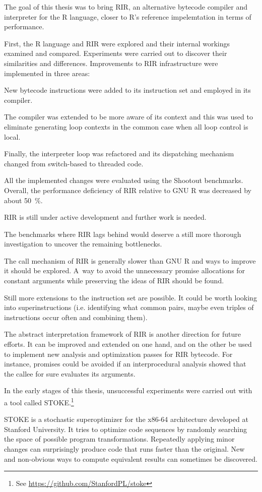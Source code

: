 The goal of this thesis was to bring RIR, an alternative bytecode compiler and interpreter for the R language, closer to R's reference impelemtation in terms of performance.

First, the R language and RIR were explored and their internal workings examined and compared. Experiments were carried out to discover their similarities and differences. Improvements to RIR infrastructure were implemented in three areas:

New bytecode instructions were added to its instruction set and employed in its compiler.

The compiler was extended to be more aware of its context and this was used to eliminate generating loop contexts in the common case when all loop control is local.

Finally, the interpreter loop was refactored and its dispatching mechanism changed from switch-based to threaded code.

All the implemented changes were evaluated using the Shootout benchmarks. Overall, the performance deficiency of RIR relative to GNU R was decreased by about 50~\%.

RIR is still under active development and further work is needed.

The benchmarks where RIR lags behind would deserve a still more thorough investigation to uncover the remaining bottlenecks.

The call mechanism of RIR is generally slower than GNU R and ways to improve it should be explored. A~way to avoid the unnecessary promise allocations for constant arguments while preserving the ideas of RIR should be found.

Still more extensions to the instruction set are possible. It could be worth looking into superinstructions (i.e. identifying what common pairs, maybe even triples of instructions occur often and combining them).

The abstract interpretation framework of RIR is another direction for future efforts. It can be improved and extended on one hand, and on the other be used to implement new analysis and optimization passes for RIR bytecode. For instance, promises could be avoided if an interprocedural analysis showed that the callee for sure evaluates its arguments.

In the early stages of this thesis, unsuccessful experiments were carried out with a tool called STOKE.\footnote{See \url{https://github.com/StanfordPL/stoke}}

STOKE is a stochastic superoptimizer for the x86-64 architecture developed at Stanford University. It tries to optimize code sequences by randomly searching the space of possible program transformations. Repeatedly applying minor changes can surprisingly produce code that runs faster than the original. New and non-obvious ways to compute equivalent results can sometimes be discovered.

